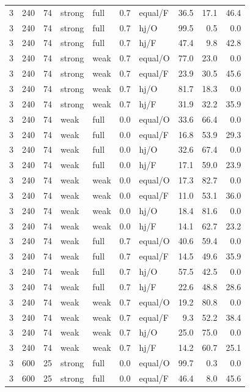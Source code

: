 {\begin{longtable}{@{}rrrllllrrr@{}}
3 & 240 & 74 & strong & full & 0.7 & equal/F & 36.5 & 17.1 & 46.4\\
3 & 240 & 74 & strong & full & 0.7 & hj/O & 99.5 & 0.5 & 0.0\\
3 & 240 & 74 & strong & full & 0.7 & hj/F & 47.4 & 9.8 & 42.8\\
3 & 240 & 74 & strong & weak & 0.7 & equal/O & 77.0 & 23.0 & 0.0\\
3 & 240 & 74 & strong & weak & 0.7 & equal/F & 23.9 & 30.5 & 45.6\\
3 & 240 & 74 & strong & weak & 0.7 & hj/O & 81.7 & 18.3 & 0.0\\
3 & 240 & 74 & strong & weak & 0.7 & hj/F & 31.9 & 32.2 & 35.9\\
3 & 240 & 74 & weak & full & 0.0 & equal/O & 33.6 & 66.4 & 0.0\\
3 & 240 & 74 & weak & full & 0.0 & equal/F & 16.8 & 53.9 & 29.3\\
3 & 240 & 74 & weak & full & 0.0 & hj/O & 32.6 & 67.4 & 0.0\\
3 & 240 & 74 & weak & full & 0.0 & hj/F & 17.1 & 59.0 & 23.9\\
3 & 240 & 74 & weak & weak & 0.0 & equal/O & 17.3 & 82.7 & 0.0\\
3 & 240 & 74 & weak & weak & 0.0 & equal/F & 11.0 & 53.1 & 36.0\\
3 & 240 & 74 & weak & weak & 0.0 & hj/O & 18.4 & 81.6 & 0.0\\
3 & 240 & 74 & weak & weak & 0.0 & hj/F & 14.1 & 62.7 & 23.2\\
3 & 240 & 74 & weak & full & 0.7 & equal/O & 40.6 & 59.4 & 0.0\\
3 & 240 & 74 & weak & full & 0.7 & equal/F & 14.5 & 49.6 & 35.9\\
3 & 240 & 74 & weak & full & 0.7 & hj/O & 57.5 & 42.5 & 0.0\\
3 & 240 & 74 & weak & full & 0.7 & hj/F & 22.6 & 48.8 & 28.6\\
3 & 240 & 74 & weak & weak & 0.7 & equal/O & 19.2 & 80.8 & 0.0\\
3 & 240 & 74 & weak & weak & 0.7 & equal/F & 9.3 & 52.2 & 38.4\\
3 & 240 & 74 & weak & weak & 0.7 & hj/O & 25.0 & 75.0 & 0.0\\
3 & 240 & 74 & weak & weak & 0.7 & hj/F & 14.2 & 60.7 & 25.1\\
3 & 600 & 25 & strong & full & 0.0 & equal/O & 99.7 & 0.3 & 0.0\\
3 & 600 & 25 & strong & full & 0.0 & equal/F & 46.4 & 8.0 & 45.6\\

\end{longtable}}
